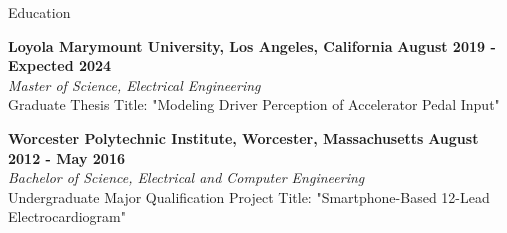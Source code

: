 \documentclass{resume} %
\begin{document}
	
	
	\begin{rSection}{Education}
		
		{\bf Loyola Marymount University, Los Angeles, California} \hfill {\bf August 2019 - Expected 2024}
		\\ {\em Master of Science, Electrical Engineering}
		\\ Graduate Thesis Title: "Modeling Driver Perception of Accelerator Pedal Input"
		
		{\bf Worcester Polytechnic Institute, Worcester, Massachusetts} \hfill {\bf August 2012 - May 2016}  
		\\ {\em Bachelor of Science,  Electrical and Computer Engineering}
		\\ Undergraduate Major Qualification Project Title: "Smartphone-Based 12-Lead Electrocardiogram"
		
	\end{rSection}
	
\end{document}

